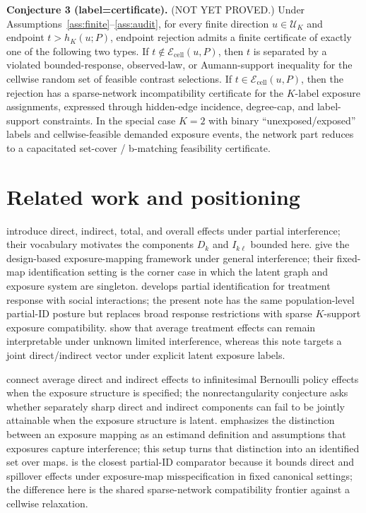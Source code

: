 \documentclass[11pt]{article}
\theoremstyle{definition}
\theoremstyle{plain}
\theoremstyle{remark}
\begin{document}
\noindent\textbf{Conjecture 3 (label=certificate).}
(NOT YET PROVED.)  Under Assumptions~\ref{ass:finite}--\ref{ass:audit}, for every finite direction \(u\in\mathcal U_K\) and endpoint \(t>h_K(u;P)\), endpoint rejection admits a finite certificate of exactly one of the following two types.  If \(t\notin\mathcal E_{\mathrm{cell}}(u,P)\), then \(t\) is separated by a violated bounded-response, observed-law, or Aumann-support inequality for the cellwise random set of feasible contrast selections.  If \(t\in\mathcal E_{\mathrm{cell}}(u,P)\), then the rejection has a sparse-network incompatibility certificate for the \(K\)-label exposure assignments, expressed through hidden-edge incidence, degree-cap, and label-support constraints.  In the special case \(K=2\) with binary ``unexposed/exposed'' labels and cellwise-feasible demanded exposure events, the network part reduces to a capacitated set-cover / b-matching feasibility certificate.

\section{Related work and positioning}
\cite{HudgensHalloran2008} introduce direct, indirect, total, and overall effects under partial interference; their vocabulary motivates the components \(D_k\) and \(I_{k\ell}\) bounded here.  \cite{AronowSamii2017} give the design-based exposure-mapping framework under general interference; their fixed-map identification setting is the corner case in which the latent graph and exposure system are singleton.  \cite{Manski2013} develops partial identification for treatment response with social interactions; the present note has the same population-level partial-ID posture but replaces broad response restrictions with sparse \(K\)-support exposure compatibility.  \cite{SavjeAronowHudgens2021} show that average treatment effects can remain interpretable under unknown limited interference, whereas this note targets a joint direct/indirect vector under explicit latent exposure labels.

\cite{HuLiWager2022} connect average direct and indirect effects to infinitesimal Bernoulli policy effects when the exposure structure is specified; the nonrectangularity conjecture asks whether separately sharp direct and indirect components can fail to be jointly attainable when the exposure structure is latent.  \cite{Savje2024} emphasizes the distinction between an exposure mapping as an estimand definition and assumptions that exposures capture interference; this setup turns that distinction into an identified set over maps.  \cite{SchroderOprescuFeuerriegelKallus2026} is the closest partial-ID comparator because it bounds direct and spillover effects under exposure-map misspecification in fixed canonical settings; the difference here is the shared sparse-network compatibility frontier against a cellwise relaxation.
\end{document}
